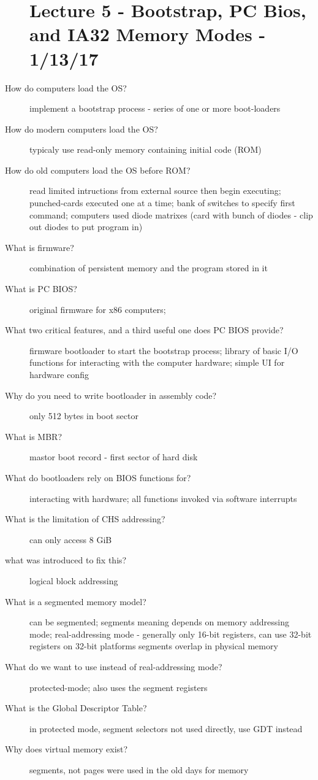 \documentclass[10pt]{article}
\begin{document}
\begin{description}
\section{Lecture 5 - Bootstrap, PC Bios, and IA32 Memory Modes - 1/13/17}
\item[How do computers load the OS?]
  implement a bootstrap process - series of one or more boot-loaders
\item[How do modern computers load the OS?]
  typicaly use read-only memory containing initial code (ROM)
\item[How do old computers load the OS before ROM?]
  read limited intructions from external source then begin executing;
  punched-cards executed one at a time;
  bank of switches to specify first command;
  computers used diode matrixes (card with bunch of diodes - clip out diodes to put program in)
\item[What is firmware?]
  combination of persistent memory and the program stored in it
\item[What is PC BIOS?]
  original firmware for x86 computers;
\item[What two critical features, and a third useful one does PC BIOS provide?]
  firmware bootloader to start the bootstrap process;
  library of basic I/O functions for interacting with the computer hardware;
  simple UI for hardware config
\item[Why do you need to write bootloader in assembly code?]
  only 512 bytes in boot sector
\item[What is MBR?]
  mastor boot record - first sector of hard disk
\item[What do bootloaders rely on BIOS functions for?]
  interacting with hardware; all functions invoked via software interrupts
\item[What is the limitation of CHS addressing?]
  can only access 8 GiB
\item[what was introduced to fix this?]
  logical block addressing
\item[What is a segmented memory model?]
  can be segmented; segments meaning depends on memory addressing mode;
  real-addressing mode - generally only 16-bit registers, can use 32-bit registers on 32-bit platforms
  segments overlap in physical memory
\item[What do we want to use instead of real-addressing mode?]
  protected-mode;
  also uses the segment registers
\item[What is the Global Descriptor Table?]
  in protected mode, segment selectors not used directly, use GDT instead
\item[Why does virtual memory exist?]
  segments, not pages were used in the old days for memory
\end{description}
\end{document}
